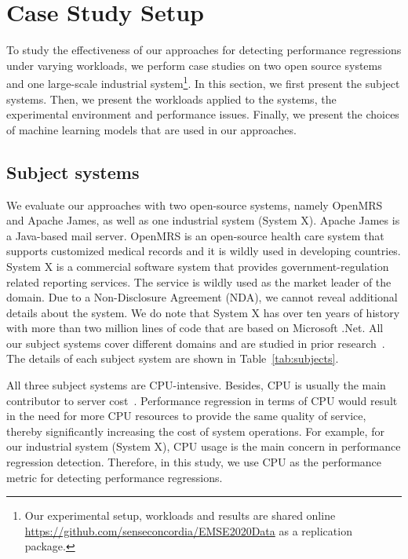 \section{Case Study Setup} \label{sec:casestudysetup}
To study the effectiveness of our approaches for detecting performance regressions under varying workloads, we perform case studies on two open source systems and one large-scale industrial system\footnote{Our experimental setup, workloads and results are shared online \url{https://github.com/senseconcordia/EMSE2020Data} as a replication package.}. In this section, we first present the subject systems. Then, we present the workloads applied to the systems, the experimental environment and performance issues. Finally, we present the choices of machine learning models that are used in our approaches. 

\subsection{Subject systems}
We evaluate our approaches with two open-source systems, namely OpenMRS and Apache James, as well as one industrial system (System X). Apache James is a Java-based mail server. OpenMRS is an open-source health care system that supports customized medical records and it is wildly used in developing countries. System X is a commercial software system that provides government-regulation related reporting services. The service is wildly used as the market leader of the domain. Due to a Non-Disclosure Agreement (NDA), we cannot reveal additional details about the system. We do note that System X has over ten years of history with more than two million lines of code that are based on Microsoft .Net. All our subject systems cover different domains and are studied in prior research~\citep{Yao:2018:LSL:3184407.3184416, DBLP:conf/icst/GaoJBL16}. The details of each subject system are shown in Table~\ref{tab:subjects}. 

All three subject systems are CPU-intensive. Besides, CPU is usually the main contributor to server cost~\citep{Greenberg:2008:CCR:1496091.1496103}. Performance regression in terms of CPU would result in the need for more CPU resources to provide the same quality of service, thereby significantly increasing the cost of system operations. 
For example, for our industrial system (System X), CPU usage is the main concern in performance regression detection.
Therefore, in this study, we use CPU as the performance metric for detecting performance regressions.


